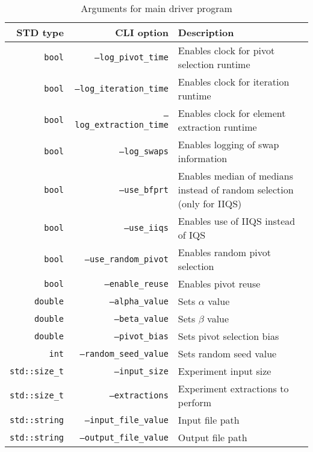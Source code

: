 \begin{table}[!ht]
    \centering

    \begin{tabularx}{\linewidth}{|r|r|X|}
        \hline
        STD type & CLI option & Description \\
        \hline
        \texttt{bool} & \texttt{--log\_pivot\_time} & Enables clock for pivot selection runtime\\
        \hline
        \texttt{bool} & \texttt{--log\_iteration\_time} & Enables clock for iteration runtime \\
        \hline
        \texttt{bool} & \texttt{--log\_extraction\_time} & Enables clock for element extraction runtime\\
        \hline
        \texttt{bool} & \texttt{--log\_swaps} & Enables logging of swap information \\
        \hline
        \texttt{bool} & \texttt{--use\_bfprt} & Enables median of medians instead of random selection (only for IIQS) \\
        \hline
        \texttt{bool} & \texttt{--use\_iiqs} & Enables use of IIQS instead of IQS \\
        \hline
        \texttt{bool} & \texttt{--use\_random\_pivot} & Enables random pivot selection \\
        \hline
        \texttt{bool} & \texttt{--enable\_reuse} & Enables pivot reuse \\
        \hline
        \texttt{double} & \texttt{--alpha\_value} & Sets $\alpha$ value \\
        \hline
        \texttt{double} & \texttt{--beta\_value} & Sets $\beta$ value \\
        \hline
        \texttt{double} & \texttt{--pivot\_bias} & Sets pivot selection bias \\
        \hline
        \texttt{int} & \texttt{--random\_seed\_value} & Sets random seed value \\
        \hline
        \texttt{std::size\_t} & \texttt{--input\_size} & Experiment input size \\
        \hline
        \texttt{std::size\_t} & \texttt{--extractions} & Experiment extractions to perform \\
        \hline
        \texttt{std::string} & \texttt{--input\_file\_value} & Input file path \\
        \hline
        \texttt{std::string} & \texttt{--output\_file\_value} & Output file path \\
        \hline    
    \end{tabularx}
    \caption{Arguments for main driver program}
    \label{TABLE:ARGUMENTS}
\end{table}

